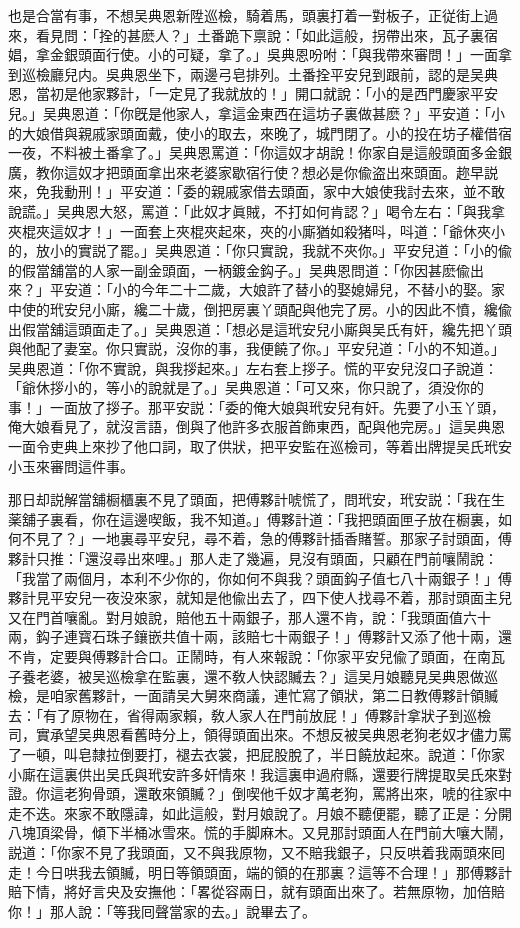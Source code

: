 也是合當有事，不想吴典恩新陞巡檢，騎着馬，頭裏打着一對板子，正従街上過來，看見問：「拴的甚麽人？」土番跪下禀說：「如此這般，拐帶出來，瓦子裏宿娼，拿金銀頭面行使。小的可疑，拿了。」吳典恩吩咐：「與我帶來審問！」一面拿到巡檢廳兒内。吳典恩坐下，兩邊弓皂排列。土番拴平安兒到跟前，認的是吴典恩，當初是他家夥計，「一定見了我就放的！」開口就說：「小的是西門慶家平安兒。」吴典恩道：「你旣是他家人，拿這金東西在這坊子裏做甚麽？」平安道：「小的大娘借與親戚家頭面戴，使小的取去，來晚了，城門閉了。小的投在坊子權借宿一夜，不料被土番拿了。」吴典恩罵道：「你這奴才胡說！你家自是這般頭面多金銀廣，教你這奴才把頭面拿出來老婆家歇宿行使？想必是你偸盗出來頭面。趂早説來，免我動刑！」平安道：「委的親戚家借去頭面，家中大娘使我討去來，並不敢說謊。」吴典恩大怒，罵道：「此奴才眞賊，不打如何肯認？」喝令左右：「與我拿夾棍夾這奴才！」一面套上夾棍夾起來，夾的小廝猶如殺猪呌，呌道：「爺休夾小的，放小的實説了罷。」吴典恩道：「你只實說，我就不夾你。」平安兒道：「小的偸的假當舖當的人家一副金頭面，一柄鍍金鈎子。」吴典恩問道：「你因甚麽偸出來？」平安道：「小的今年二十二歲，大娘許了替小的娶媳婦兒，不替小的娶。家中使的玳安兒小廝，纔二十歲，倒把房裏丫頭配與他完了房。小的因此不憤，纔偸出假當舖這頭面走了。」吴典恩道：「想必是這玳安兒小廝與吴氏有奸，纔先把丫頭與他配了妻室。你只實説，沒你的事，我便饒了你。」平安兒道：「小的不知道。」吴典恩道：「你不實說，與我拶起來。」左右套上拶子。慌的平安兒沒口子說道：「爺休拶小的，等小的說就是了。」吴典恩道：「可又來，你只說了，須没你的事！」一面放了拶子。那平安説：「委的俺大娘與玳安兒有奸。先要了小玉丫頭，俺大娘看見了，就沒言語，倒與了他許多衣服首飾東西，配與他完房。」這吴典恩一面令吏典上來抄了他口詞，取了供狀，把平安監在巡檢司，等着出牌提吴氏玳安小玉來審問這件事。

那日却説解當舖橱櫃裏不見了頭面，把傅夥計唬慌了，問玳安，玳安説：「我在生薬舖子裏看，你在這邊喫飯，我不知道。」傅夥計道：「我把頭面匣子放在橱裏，如何不見了？」一地裏尋平安兒，尋不着，急的傅夥計插香賭誓。那家子討頭面，傅夥計只推：「還沒尋出來哩。」那人走了幾遍，見沒有頭面，只顧在門前嚷鬧說：「我當了兩個月，本利不少你的，你如何不與我？頭面鈎子值七八十兩銀子！」傅夥計見平安兒一夜没來家，就知是他偸出去了，四下使人找尋不着，那討頭面主兒又在門首嚷亂。對月娘說，賠他五十兩銀子，那人還不肯，說：「我頭面值六十兩，鈎子連寳石珠子鑲嵌共值十兩，該賠七十兩銀子！」傅夥計又添了他十兩，還不肯，定要與傅夥計合口。正鬧時，有人來報說：「你家平安兒偸了頭面，在南瓦子養老婆，被吴巡檢拿在監裏，還不敎人快認贓去？」這吴月娘聽見吴典恩做巡檢，是咱家舊夥計，一面請吴大舅來商議，連忙寫了領狀，第二日教傅夥計領贓去：「有了原物在，省得兩家賴，敎人家人在門前放屁！」傅夥計拿狀子到巡檢司，實承望吴典恩看舊時分上，領得頭面出來。不想反被吴典恩老狗老奴才儘力罵了一頓，叫皂隸拉倒要打，褪去衣裳，把屁股脫了，半日饒放起來。說道：「你家小廝在這裏供出吴氏與玳安許多奸情來！我這裏申過府縣，還要行牌提取吴氏來對證。你這老狗骨頭，還敢來領贓？」倒喫他千奴才萬老狗，罵將出來，唬的往家中走不迭。來家不敢隱諱，如此這般，對月娘說了。月娘不聽便罷，聽了正是：分開八塊頂梁骨，傾下半桶冰雪來。慌的手脚麻木。又見那討頭面人在門前大嚷大鬧，説道：「你家不見了我頭面，又不與我原物，又不賠我銀子，只反哄着我兩頭來囘走！今日哄我去領贓，明日等領頭面，端的領的在那裏？這等不合理！」那傅夥計賠下情，將好言央及安撫他：「畧從容兩日，就有頭面出來了。若無原物，加倍賠你！」那人說：「等我囘聲當家的去。」說畢去了。

